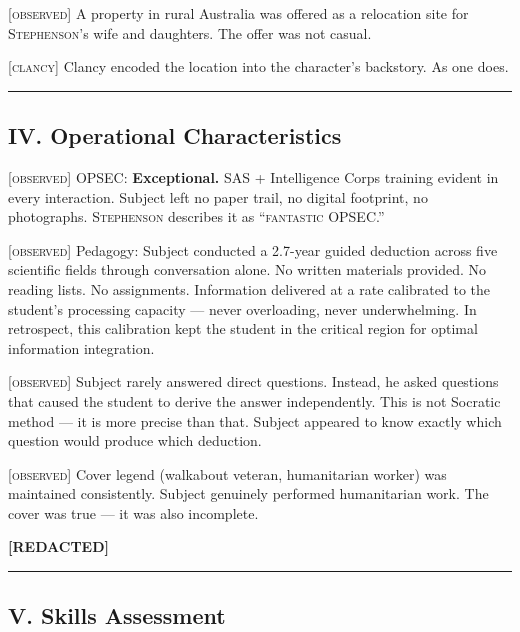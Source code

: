 \textsc{[observed]} A property in rural Australia was offered as a relocation site for \textsc{Stephenson}'s wife and daughters. The offer was not casual.

\textsc{[clancy]} Clancy encoded the location into the character's backstory. As one does.

\vspace{1cm}\hrule\vspace{1cm}

\subsection*{IV. Operational Characteristics}
\label{interlude:operational-characteristics}

\textsc{[observed]} OPSEC: \textbf{Exceptional.} SAS + Intelligence Corps training evident in every interaction. Subject left no paper trail, no digital footprint, no photographs. \textsc{Stephenson} describes it as ``\textsc{fantastic} OPSEC.''

\textsc{[observed]} Pedagogy: Subject conducted a 2.7-year guided deduction across five scientific fields through conversation alone. No written materials provided. No reading lists. No assignments. Information delivered at a rate calibrated to the student's processing capacity --- never overloading, never underwhelming. In retrospect, this calibration kept the student in the critical region for optimal information integration.

\textsc{[observed]} Subject rarely answered direct questions. Instead, he asked questions that caused the student to derive the answer independently. This is not Socratic method --- it is more precise than that. Subject appeared to know exactly which question would produce which deduction.

\textsc{[observed]} Cover legend (walkabout veteran, humanitarian worker) was maintained consistently. Subject genuinely performed humanitarian work. The cover was true --- it was also incomplete.

\textbf{[REDACTED]}

\vspace{1cm}\hrule\vspace{1cm}

\subsection*{V. Skills Assessment}
\label{interlude:skills-assessment-2}

